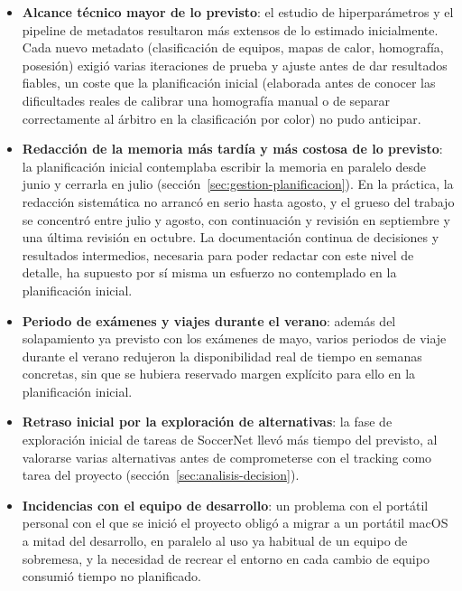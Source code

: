 \begin{itemize}
  \item \textbf{Alcance técnico mayor de lo previsto}: el estudio de
        hiperparámetros y el pipeline de metadatos resultaron más
        extensos de lo estimado inicialmente. Cada nuevo metadato
        (clasificación de equipos, mapas de calor, homografía, posesión)
        exigió varias iteraciones de prueba y ajuste antes de dar
        resultados fiables, un coste que la planificación inicial
        (elaborada antes de conocer las dificultades reales de calibrar
        una homografía manual o de separar correctamente al árbitro en la
        clasificación por color) no pudo anticipar.
  \item \textbf{Redacción de la memoria más tardía y más costosa de lo
        previsto}: la planificación inicial contemplaba escribir la
        memoria en paralelo desde junio y cerrarla en julio
        (sección~\ref{sec:gestion-planificacion}). En la práctica, la
        redacción sistemática no arrancó en
        serio hasta agosto, y el grueso del trabajo se concentró entre
        julio y agosto, con continuación y revisión en septiembre y una
        última revisión en octubre. La documentación continua de
        decisiones y resultados intermedios, necesaria para poder
        redactar con este nivel de detalle, ha supuesto por sí misma un
        esfuerzo no contemplado en la planificación inicial.
  \item \textbf{Periodo de exámenes y viajes durante el verano}: además
        del solapamiento ya previsto con los exámenes de mayo, varios periodos de
        viaje durante el verano redujeron la disponibilidad real de
        tiempo en semanas concretas, sin que se hubiera reservado margen
        explícito para ello en la planificación inicial.
  \item \textbf{Retraso inicial por la exploración de alternativas}: la
        fase de exploración inicial de tareas de SoccerNet
         llevó más tiempo del previsto,
        al valorarse varias alternativas antes de comprometerse con el
        tracking como tarea del proyecto
        (sección~\ref{sec:analisis-decision}).
  \item \textbf{Incidencias con el equipo de desarrollo}: un problema con
        el portátil personal con el que se inició el proyecto obligó a
        migrar a un portátil macOS a mitad del desarrollo, en paralelo al
        uso ya habitual de un equipo de sobremesa, y la necesidad de
        recrear el entorno en cada cambio de equipo consumió tiempo no
        planificado.
\end{itemize}

